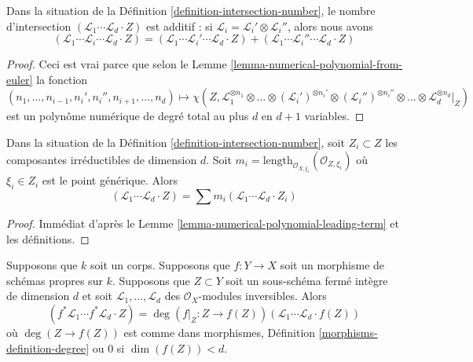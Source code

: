 \begin{lemma}
\label{lemma-intersection-number-additive}
Dans la situation de la Définition
\ref{definition-intersection-number}, le nombre
d'intersection $(\mathcal{L}_1 \cdots \mathcal{L}_d
\cdot Z)$ est additif : si $\mathcal{L}_i =
\mathcal{L}_i' \otimes \mathcal{L}_i''$, alors nous avons
$$
(\mathcal{L}_1 \cdots \mathcal{L}_i \cdots \mathcal{L}_d \cdot Z) =
(\mathcal{L}_1 \cdots \mathcal{L}_i' \cdots \mathcal{L}_d \cdot Z) +
(\mathcal{L}_1 \cdots \mathcal{L}_i'' \cdots \mathcal{L}_d \cdot Z)
$$
\end{lemma}

\begin{proof}
Ceci est vrai parce que selon le Lemme
\ref{lemma-numerical-polynomial-from-euler} la fonction
$$
(n_1, \ldots, n_{i - 1}, n_i', n_i'', n_{i + 1}, \ldots, n_d)
\mapsto
\chi(Z, \mathcal{L}_1^{\otimes n_1} \otimes
\ldots \otimes (\mathcal{L}_i')^{\otimes n_i'} \otimes
(\mathcal{L}_i'')^{\otimes n_i''} \otimes \ldots \otimes
\mathcal{L}_d^{\otimes n_d}|_Z)
$$
est un polynôme numérique de degré total au plus $d$ en $d + 1$ variables.
\end{proof}

\begin{lemma}
\label{lemma-intersection-number-in-terms-of-components}
Dans la situation de la Définition
\ref{definition-intersection-number}, soit $Z_i \subset Z$ les composantes
irréductibles de dimension $d$. Soit $m_i = \text{length}_{\mathcal{O}_{X,
\xi_i}}(\mathcal{O}_{Z, \xi_i})$ où $\xi_i \in Z_i$ est le point générique. Alors
$$
(\mathcal{L}_1 \cdots \mathcal{L}_d \cdot Z) =
\sum m_i(\mathcal{L}_1 \cdots \mathcal{L}_d \cdot Z_i)
$$
\end{lemma}

\begin{proof}
Immédiat d'après le Lemme
\ref{lemma-numerical-polynomial-leading-term} et les définitions.
\end{proof}

\begin{lemma}
\label{lemma-intersection-number-and-pullback}
Supposons que $k$ soit un corps. Supposons que $f : Y \to X$ soit un
morphisme de schémas propres sur $k$. Supposons que $Z \subset Y$ soit
un sous-schéma fermé intègre de dimension $d$ et soit $\mathcal{L}_1,
\ldots, \mathcal{L}_d$ des $\mathcal{O}_X$-modules inversibles. Alors
$$
(f^*\mathcal{L}_1 \cdots f^*\mathcal{L}_d \cdot Z) =
\deg(f|_Z : Z \to f(Z)) (\mathcal{L}_1 \cdots \mathcal{L}_d \cdot f(Z))
$$
où $\deg(Z \to f(Z))$ est comme dans
morphismes, Définition
\ref{morphisms-definition-degree} ou $0$ si $\dim(f(Z)) < d$.
\end{lemma}

